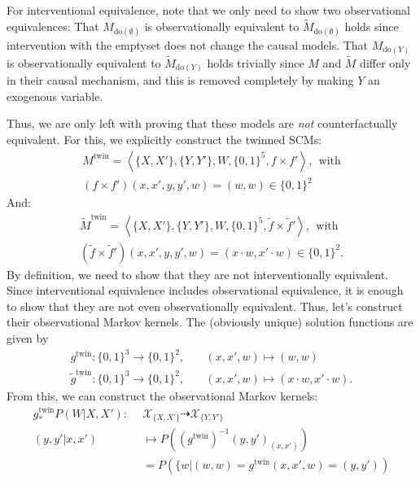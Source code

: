 \begin{enumerate}[label=12.\arabic*]
\begin{gradedsolution}
\begin{enumerate}
			For interventional equivalence, note that we only need to show two observational equivalences:
			That $M_{\text{do}(\emptyset)}$ is observationally equivalent to $\tilde{M}_{\text{do}(\emptyset)}$ holds since intervention with the emptyset does not change the causal models.
			That $M_{\text{do}(Y)}$ is observationally equivalent to $\tilde{M}_{\text{do}(Y)}$ holds trivially since $M$ and $\tilde{M}$ differ only in their causal mechanism, and this is removed completely by making $Y$ an exogenous variable.

			Thus, we are only left with proving that these models are \emph{not} counterfactually equivalent.
			For this, we explicitly construct the twinned SCMs:
			\begin{align*}
				M^{\text{twin}} = \left\langle \{X, X'\}, \{Y, Y'\}, W, \{0,1\}^5, f \times f' \right\rangle, \ \ \text{with} \\
				(f\times f')(x, x', y, y', w)  = (w, w) \in \{0,1\}^2
			\end{align*}
			And:
			\begin{align*}
				\tilde{M}^{\text{twin}} = \left\langle \{X, X'\}, \{Y, Y'\}, W, \{0,1\}^5, \tilde{f} \times \tilde{f}' \right\rangle, \ \ \text{with} \\
				(\tilde{f} \times \tilde{f}')(x, x', y, y', w) = (x \cdot w, x' \cdot w) \in \{0, 1\}^2.
			\end{align*}
			By definition, we need to show that they are not interventionally equivalent.
			Since interventional equivalence includes observational equivalence, it is enough to show that they are not even observationally equivalent.
			Thus, let's construct their observational Markov kernels.
			The (obviously unique) solution functions are given by
			\begin{align*}
				g^{\text{twin}}: \{0,1\}^3 \to \{0,1\}^2,         & \quad (x, x', w) \mapsto (w, w)                   \\
				\tilde{g}^{\text{twin}}: \{0,1\}^3 \to \{0,1\}^2, & \quad (x, x', w) \mapsto (x \cdot w, x' \cdot w).
			\end{align*}
			From this, we can construct the observational Markov kernels:
			\begin{align*}
				g^{\text{twin}}_* P(W | X, X'): \ \  & \mathcal{X}_{\{X,X'\}} \dashrightarrow \mathcal{X}_{\{Y,Y'\}}            \\
				(y, y' | x, x')                      & \mapsto P\left((g^{\text{twin}})^{-1}(y, y')_{(x,x')}\right)             \\
				                                     & = P\left(\{w | (w,w) = g^{\text{twin}}(x, x', w) = (y, y')\right)        \\

\end{align*}
\end{enumerate}
\end{gradedsolution}
\end{enumerate}
